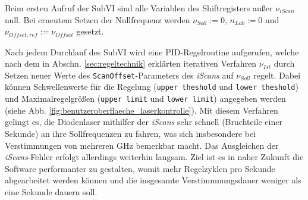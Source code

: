 Beim ersten Aufruf der SubVI sind alle Variablen des Shiftregisters außer
$\nu_{iScan}$ null. Bei erneutem Setzen der Nullfrequenz werden $\nu_{Soll}:=0$,
$n_{Lab}:=0$ und $\nu_{Offset,ref}:=\nu_{Offset}$ gesetzt.\par
Nach jedem Durchlauf des SubVI wird eine PID-Regelroutine aufgerufen, welche
nach dem in Abschn. \ref{sec:regeltechnik} erklärten iterativen Verfahren
$\nu_{Ist}$ durch Setzen neuer Werte des
\lstinline|ScanOffset|-Parameters des \textit{iScans} auf $\nu_{Soll}$ regelt.
Dabei können Schwellenwerte für die Regelung (\lstinline|upper theshold| und
\lstinline|lower theshold|) und Maximalregelgrößen (\lstinline|upper limit| und
\lstinline|lower limit|) angegeben werden (siehe Abb.
\ref{fig:benutzeroberflaeche_laserkontrolle}). Mit diesem Verfahren gelingt es,
die Diodenlaser mithilfer der \textit{iScans} sehr schnell (Bruchteile einer
Sekunde) an ihre Sollfrequenzen zu fahren, was sich insbesondere bei
Verstimmungen von mehreren GHz bemerkbar macht. Das Ausgleichen der
\textit{iScans}-Fehler erfolgt allerdings weiterhin langsam. Ziel ist es
in naher Zukunft die Software performanter zu gestalten, womit mehr
Regelzyklen pro Sekunde abgearbeitet werden können und die insgesamte
Verstimmnungsdauer weniger als eine Sekunde dauern soll.

